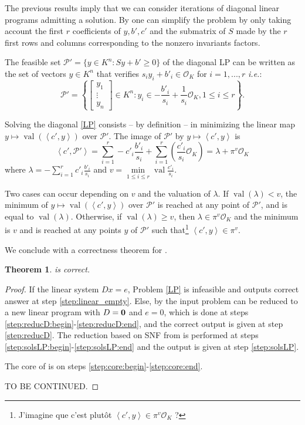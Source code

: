 \documentclass[a4paper,oneside,11pt]{article}
\newtheorem{theorem}{Theorem}[section]
\newcommand{\PP}{\mathcal{P}}
\newcommand{\simone}[1]{{\color{blue} #1}} %
\DeclareMathOperator{\val}{val}
\newcommand{\OK}{\mathcal{O}_K}
\begin{document}
The previous results imply that we can consider iterations of diagonal linear programs admitting a solution. By  one can simplify the problem by only taking account the first $r$ coefficients of $y, b', c'$ and the submatrix of $S$ made by the $r$ first rows and columns corresponding to the nonzero invariants factors.

The feasible set $\PP' = \{y \in K^n : Sy+b' \geq 0\}$ of the diagonal LP can be written as the set of vectors
$y \in K^n$ that verifies $s_i y_i + b'_i \in \OK$ for $i=1,...,r$ {\it i.e.}:
$$
\PP' = \left\{\left[\begin{smallmatrix} y_1\\ \vdots\\ y_n \end{smallmatrix}\right] \in K^n :
y_i \in -\frac{b'_i}{s_i} + \frac{1}{s_i} \OK, 1\le i\le r\right\}.
$$

Solving the diagonal \eqref{LP} consists -- by definition -- in minimizing the linear map $y \mapsto \val\left(\left\langle
c',y \right\rangle\right)$ over $\PP'$. The image of $\PP'$ by $y \mapsto \left\langle c',y \right\rangle$ is
\[
\left\langle c',\PP' \right\rangle = \sum_{i=1}^r -c'_i \frac{b'_i}{s_i} + \sum_{i=1}^r\left( \frac{c'_i}{s_{i}} \OK \right) = \lambda + \pi^{v} \OK
\]
where $\lambda = -\sum_{i=1}^r c'_i \frac{b'_i}{s_i}$ and $v = \min\limits_{1\le i\le r} \val \frac{c'_{i}}{s_{i}} $.

Two cases can occur depending on $v$ and the valuation of $\lambda$.
If $\val(\lambda) < v$, the minimum of $y\mapsto \val\left(\left\langle c',y \right\rangle\right)$ over $\PP'$ is reached at any point of $\PP'$, and is equal to $\val(\lambda)$.
Otherwise, if $\val(\lambda) \ge v$, then $\lambda \in \pi^{v} \OK$ and the minimum is $v$ and is reached at any points $y$ of $\PP'$ such that\footnote{\simone{J'imagine que c'est plutôt
$\left<c',y \right> \in \pi^v\OK$ ?}} $\left<c',y \right> \in \pi^v$.

We conclude with a correctness theorem for .
  
  \begin{theorem}  is correct.
  \end{theorem}
  \begin{proof}
    If the linear system $Dx=e$, Problem \eqref{LP} is infeasible
    and  outputs correct answer at step \ref{step:linear_empty}.
    Else, by  the input problem can be reduced to a new linear
    program with $D={\bf 0}$ and $e=0$, which is done at steps
    \ref{step:reducD:begin}-\ref{step:reducD:end},
    and the correct output is given at step \ref{step:reducD}.
    The reduction based on SNF from  is performed at
    steps \ref{step:solsLP:begin}-\ref{step:solsLP:end} and the output
    is given at step \ref{step:solsLP}.

    The core of  is on steps \ref{step:core:begin}-\ref{step:core:end}.

    TO BE CONTINUED.
  \end{proof}
\end{document}
